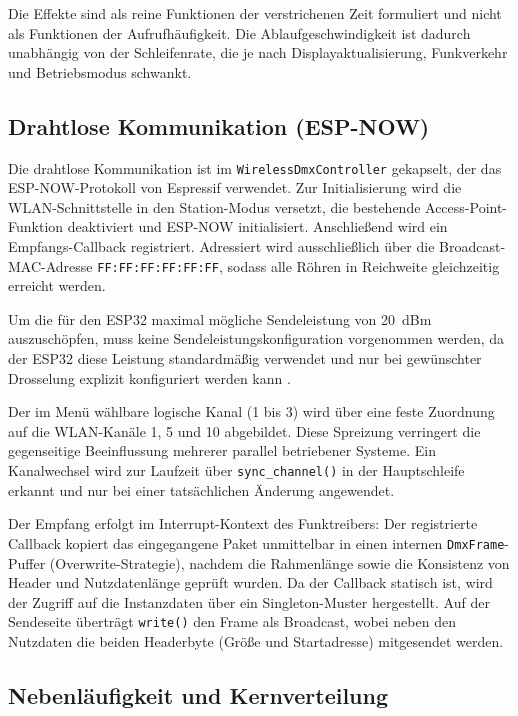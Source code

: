 Die Effekte sind als reine Funktionen der verstrichenen Zeit
formuliert und nicht als Funktionen der Aufrufhäufigkeit. Die
Ablaufgeschwindigkeit ist dadurch unabhängig von der Schleifenrate,
die je nach Displayaktualisierung, Funkverkehr und Betriebsmodus
schwankt.

\subsection{Drahtlose Kommunikation (ESP-NOW)}
\label{subsec:espnow}

Die drahtlose Kommunikation ist im \texttt{WirelessDmxController}
gekapselt, der das ESP-NOW-Protokoll von Espressif verwendet. Zur
Initialisierung wird die WLAN-Schnittstelle in den Station-Modus
versetzt, die bestehende Access-Point-Funktion deaktiviert und ESP-NOW
initialisiert. Anschließend wird ein Empfangs-Callback registriert.
Adressiert wird ausschließlich über die Broadcast-MAC-Adresse
\texttt{FF:FF:FF:FF:FF:FF}, sodass alle Röhren in Reichweite gleichzeitig
erreicht werden.

Um die für den ESP32 maximal mögliche Sendeleistung von 20~dBm auszuschöpfen, 
muss keine Sendeleistungskonfiguration vorgenommen werden, da der ESP32 diese 
Leistung standardmäßig verwendet und nur bei gewünschter Drosselung explizit 
konfiguriert werden kann \cite{espressif_esp32_tx}.

Der im Menü wählbare logische Kanal (1 bis 3) wird über eine feste
Zuordnung auf die WLAN-Kanäle 1, 5 und 10 abgebildet. Diese Spreizung
verringert die gegenseitige Beeinflussung mehrerer parallel betriebener
Systeme. Ein Kanalwechsel wird zur Laufzeit über
\texttt{sync\_channel()} in der Hauptschleife erkannt und nur bei einer
tatsächlichen Änderung angewendet.

Der Empfang erfolgt im Interrupt-Kontext des Funktreibers: Der
registrierte Callback kopiert das eingegangene Paket unmittelbar in einen
internen \texttt{DmxFrame}-Puffer (Overwrite-Strategie), nachdem die
Rahmenlänge sowie die Konsistenz von Header und Nutzdatenlänge geprüft
wurden. Da der Callback statisch ist, wird der Zugriff auf die
Instanzdaten über ein Singleton-Muster hergestellt. Auf der Sendeseite
überträgt \texttt{write()} den Frame als Broadcast, wobei neben den
Nutzdaten die beiden Headerbyte (Größe und Startadresse) mitgesendet
werden.

\subsection{Nebenläufigkeit und Kernverteilung}
\label{subsec:nebenlaeufigkeit}

